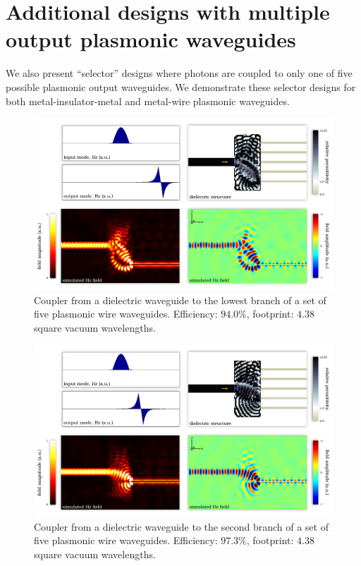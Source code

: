 \section{Additional designs with multiple output plasmonic waveguides}
We also present ``selector'' designs where photons are coupled to 
    only one of five possible plasmonic output waveguides.
We demonstrate these selector designs for both metal-insulator-metal and
    metal-wire plasmonic waveguides.
\begin{figure}[h!]
    \centering
    \includegraphics[width=\textwidth]{p3/16}
    \caption{
        Coupler from a dielectric waveguide to the 
            lowest branch of a set of five plasmonic wire waveguides.
        Efficiency: $94.0\%$,
        footprint: $4.38$ square vacuum wavelengths.
        }
\end{figure}
\begin{figure}[h!]
    \centering
    \includegraphics[width=\textwidth]{p3/17}
    \caption{
        Coupler from a dielectric waveguide to the 
            second branch of a set of five plasmonic wire waveguides.
        Efficiency: $97.3\%$,
        footprint: $4.38$ square vacuum wavelengths.
        }
\end{figure}
